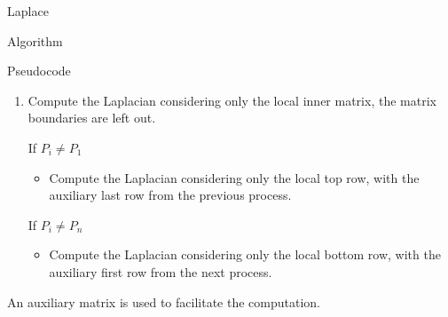 \begin{chapter}{Laplace}
\begin{section}{Algorithm}
\begin{subsection}{Pseudocode}
\begin{enumerate}
\begin{enumerate}
\begin{item}
\begin{itemize}
                        \end{itemize}
                    \end{item}
                    \item Compute the Laplacian considering only the local inner matrix, the matrix boundaries are left out.
                    \begin{item}
                        If $P_i \neq P_1$
                        \begin{itemize}
                            \item Compute the Laplacian considering only the local top row, with the auxiliary last row from the previous process.
                        \end{itemize}
                    \end{item}
                    \begin{item}
                        If $P_i \neq P_n$
                        \begin{itemize}
                            \item Compute the Laplacian considering only the local bottom row, with the auxiliary first row from the next process.
                        \end{itemize}
                    \end{item}
                \end{enumerate}
            \end{enumerate}
            An auxiliary matrix is used to facilitate the computation.
            
        \end{subsection}
    \end{section}
\end{chapter}